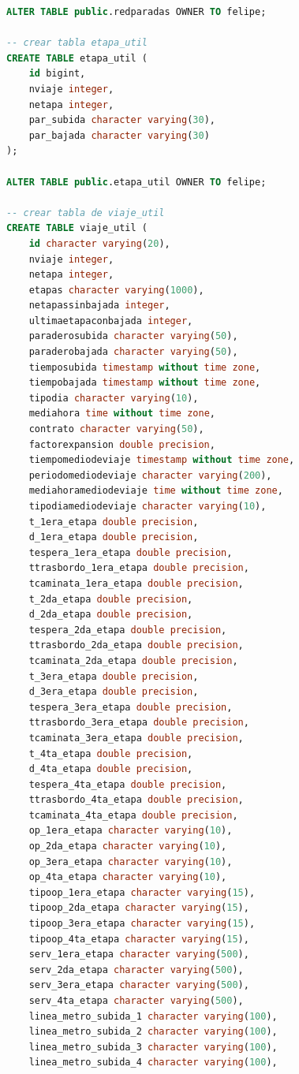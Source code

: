\documentclass[12pt]{article}
\begin{document}
\begin{lstlisting}[breaklines=true, 
				   language=SQL,  
				   title=asd, 
				   caption=Instalacion de postgres,
				   label=fig:instalar_postgres]
ALTER TABLE public.redparadas OWNER TO felipe;

-- crear tabla etapa_util
CREATE TABLE etapa_util (
    id bigint,
    nviaje integer,
    netapa integer,
    par_subida character varying(30),
    par_bajada character varying(30)
);

ALTER TABLE public.etapa_util OWNER TO felipe;

-- crear tabla de viaje_util
CREATE TABLE viaje_util (
    id character varying(20),
    nviaje integer,
    netapa integer,
    etapas character varying(1000),
    netapassinbajada integer,
    ultimaetapaconbajada integer,
    paraderosubida character varying(50),
    paraderobajada character varying(50),
    tiemposubida timestamp without time zone,
    tiempobajada timestamp without time zone,
    tipodia character varying(10),
    mediahora time without time zone,
    contrato character varying(50),
    factorexpansion double precision,
    tiempomediodeviaje timestamp without time zone,
    periodomediodeviaje character varying(200),
    mediahoramediodeviaje time without time zone,
    tipodiamediodeviaje character varying(10),
    t_1era_etapa double precision,
    d_1era_etapa double precision,
    tespera_1era_etapa double precision,
    ttrasbordo_1era_etapa double precision,
    tcaminata_1era_etapa double precision,
    t_2da_etapa double precision,
    d_2da_etapa double precision,
    tespera_2da_etapa double precision,
    ttrasbordo_2da_etapa double precision,
    tcaminata_2da_etapa double precision,
    t_3era_etapa double precision,
    d_3era_etapa double precision,
    tespera_3era_etapa double precision,
    ttrasbordo_3era_etapa double precision,
    tcaminata_3era_etapa double precision,
    t_4ta_etapa double precision,
    d_4ta_etapa double precision,
    tespera_4ta_etapa double precision,
    ttrasbordo_4ta_etapa double precision,
    tcaminata_4ta_etapa double precision,
    op_1era_etapa character varying(10),
    op_2da_etapa character varying(10),
    op_3era_etapa character varying(10),
    op_4ta_etapa character varying(10),
    tipoop_1era_etapa character varying(15),
    tipoop_2da_etapa character varying(15),
    tipoop_3era_etapa character varying(15),
    tipoop_4ta_etapa character varying(15),
    serv_1era_etapa character varying(500),
    serv_2da_etapa character varying(500),
    serv_3era_etapa character varying(500),
    serv_4ta_etapa character varying(500),
    linea_metro_subida_1 character varying(100),
    linea_metro_subida_2 character varying(100),
    linea_metro_subida_3 character varying(100),
    linea_metro_subida_4 character varying(100),

\end{lstlisting}
\end{document}
